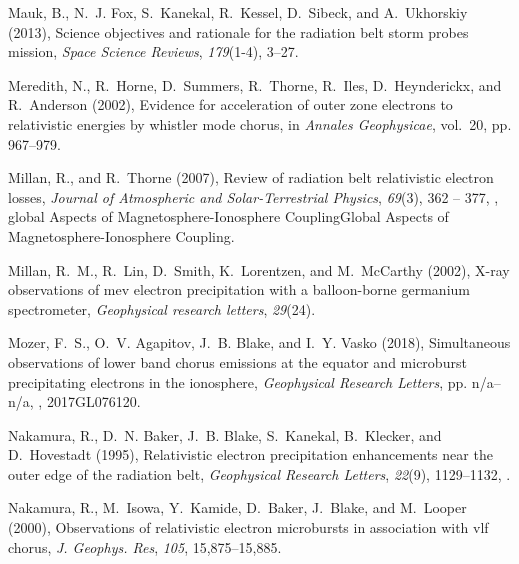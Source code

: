 \documentclass[draft, linenumbers]{agujournal}
\begin{document}
\begin{thebibliography}{49}
Mauk, B., N.~J. Fox, S.~Kanekal, R.~Kessel, D.~Sibeck, and A.~Ukhorskiy (2013),
  Science objectives and rationale for the radiation belt storm probes mission,
  \textit{Space Science Reviews}, \textit{179}(1-4), 3--27.

Meredith, N., R.~Horne, D.~Summers, R.~Thorne, R.~Iles, D.~Heynderickx, and
  R.~Anderson (2002), Evidence for acceleration of outer zone electrons to
  relativistic energies by whistler mode chorus, in \textit{Annales
  Geophysicae}, vol.~20, pp. 967--979.

Millan, R., and R.~Thorne (2007), Review of radiation belt relativistic
  electron losses, \textit{Journal of Atmospheric and Solar-Terrestrial
  Physics}, \textit{69}(3), 362 -- 377,
  , global Aspects of
  Magnetosphere-Ionosphere CouplingGlobal Aspects of Magnetosphere-Ionosphere
  Coupling.

Millan, R.~M., R.~Lin, D.~Smith, K.~Lorentzen, and M.~McCarthy (2002), X-ray
  observations of mev electron precipitation with a balloon-borne germanium
  spectrometer, \textit{Geophysical research letters}, \textit{29}(24).

Mozer, F.~S., O.~V. Agapitov, J.~B. Blake, and I.~Y. Vasko (2018), Simultaneous
  observations of lower band chorus emissions at the equator and microburst
  precipitating electrons in the ionosphere, \textit{Geophysical Research
  Letters}, pp. n/a--n/a, , 2017GL076120.

Nakamura, R., D.~N. Baker, J.~B. Blake, S.~Kanekal, B.~Klecker, and
  D.~Hovestadt (1995), Relativistic electron precipitation enhancements near
  the outer edge of the radiation belt, \textit{Geophysical Research Letters},
  \textit{22}(9), 1129--1132, .

Nakamura, R., M.~Isowa, Y.~Kamide, D.~Baker, J.~Blake, and M.~Looper (2000),
  Observations of relativistic electron microbursts in association with vlf
  chorus, \textit{J. Geophys. Res}, \textit{105}, 15,875--15,885.


\end{thebibliography}
\end{document}
